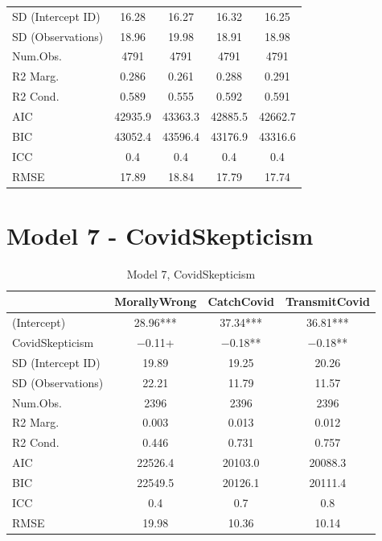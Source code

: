 \documentclass[]{report}
\begin{document}
\begin{table}
{\begin{tabular}[t]{lcccc}
		SD (Intercept ID) & \num{16.28} & \num{16.27} & \num{16.32} & \num{16.25}\\
		SD (Observations) & \num{18.96} & \num{19.98} & \num{18.91} & \num{18.98}\\
		\midrule
		Num.Obs. & \num{4791} & \num{4791} & \num{4791} & \num{4791}\\
		R2 Marg. & \num{0.286} & \num{0.261} & \num{0.288} & \num{0.291}\\
		R2 Cond. & \num{0.589} & \num{0.555} & \num{0.592} & \num{0.591}\\
		AIC & \num{42935.9} & \num{43363.3} & \num{42885.5} & \num{42662.7}\\
		BIC & \num{43052.4} & \num{43596.4} & \num{43176.9} & \num{43316.6}\\
		ICC & \num{0.4} & \num{0.4} & \num{0.4} & \num{0.4}\\
		RMSE & \num{17.89} & \num{18.84} & \num{17.79} & \num{17.74}\\
		\bottomrule
	\end{tabular}}
\end{table}


\chapter{Model 7 - CovidSkepticism}

\begin{table}
	
	\caption{Model 7, CovidSkepticism}
	\centering
	\begin{tabular}[t]{lccc}
		\toprule
		& MorallyWrong & CatchCovid & TransmitCovid\\
		\midrule
		(Intercept) & \num{28.96}*** & \num{37.34}*** & \num{36.81}***\\
		CovidSkepticism & \num{-0.11}+ & \num{-0.18}** & \num{-0.18}**\\
		SD (Intercept ID) & \num{19.89} & \num{19.25} & \num{20.26}\\
		SD (Observations) & \num{22.21} & \num{11.79} & \num{11.57}\\
		\midrule
		Num.Obs. & \num{2396} & \num{2396} & \num{2396}\\
		R2 Marg. & \num{0.003} & \num{0.013} & \num{0.012}\\
		R2 Cond. & \num{0.446} & \num{0.731} & \num{0.757}\\
		AIC & \num{22526.4} & \num{20103.0} & \num{20088.3}\\
		BIC & \num{22549.5} & \num{20126.1} & \num{20111.4}\\
		ICC & \num{0.4} & \num{0.7} & \num{0.8}\\
		RMSE & \num{19.98} & \num{10.36} & \num{10.14}\\
		\bottomrule
	\end{tabular}
\end{table}
\end{document}

